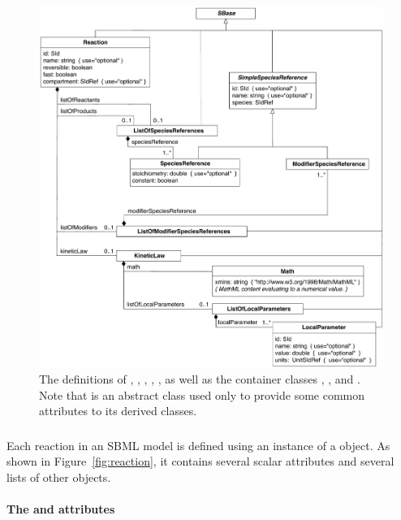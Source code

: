 \begin{figure}[htb]
  \centering
  \includegraphics[scale=0.78]{figs/reaction-uml-v2}
  \caption{The definitions of \Reaction, \KineticLaw,
    \SpeciesReference, \ModifierSpeciesReference, \LocalParameter,
    as well as the container classes \ListOfSpeciesReferences,
    \ListOfModifierSpeciesReferences, and \ListOfLocalParameters.
    Note that \SimpleSpeciesReference is an abstract class used
    only to provide some common attributes to its derived
    classes.}
  \label{fig:reaction}
\end{figure}


\subsubsection{}
\label{sec:reaction-type}
\label{sec:listofreactants}
\label{sec:listofproducts}
\label{sec:listofmodifiers}

Each reaction in an SBML model is defined using an instance of a
\Reaction object.  As shown in Figure~\vref{fig:reaction}, it
contains several scalar attributes and several lists of other
objects.


\paragraph{The  and  attributes}

